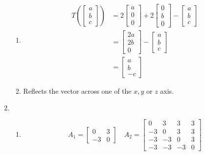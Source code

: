 \documentclass[11pt]{article}
\begin{document}
\begin{enumerate}[{\bf Q1.}]
\begin{enumerate}
			\item 
			\begin{equation}
				\begin{aligned}
				T\left(\left[\begin{array}{l}
				a \\
				b \\
				c
				\end{array}\right]\right) & =2\left[\begin{array}{l}
				a \\
				0 \\
				0
				\end{array}\right]+2\left[\begin{array}{l}
				0 \\
				b \\
				0
				\end{array}\right]-\left[\begin{array}{l}
				a \\
				b \\
				c
				\end{array}\right] \\
				& =\left[\begin{array}{c}
				2 a \\
				2 b \\
				0
				\end{array}\right]-\left[\begin{array}{l}
				a \\
				b \\
				c
				\end{array}\right] \\
				& =\left[\begin{array}{c}
				a \\
				b \\
				-c
				\end{array}\right]
				\end{aligned}
				\end{equation}

			\item 
			Reflects the vector across one of the $x, y$ or $z$ axis.

		\end{enumerate}
		
		\newpage
		
		\item 
		\begin{enumerate}
			\item 
			\begin{equation}
				A_1=\left[\begin{array}{cc}
				0 & 3 \\
				-3 & 0
				\end{array}\right] \quad A_2=\left[\begin{array}{cccc}
				0 & 3 & 3 & 3 \\
				-3 & 0 & 3 & 3 \\
				-3 & -3 & 0 & 3 \\
				-3 & -3 & -3 & 0
				\end{array}\right]
				\end{equation}


\end{enumerate}
\end{enumerate}
\end{document}
